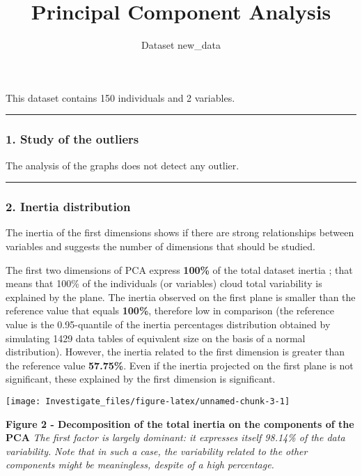 \documentclass[]{article}
\title{Principal Component Analysis}
\author{Dataset new\_data}
\date{}
\begin{document}
\maketitle

This dataset contains 150 individuals and 2 variables.

\begin{center}\rule{0.5\linewidth}{\linethickness}\end{center}

\subsubsection{1. Study of the outliers}\label{study-of-the-outliers}

The analysis of the graphs does not detect any outlier.

\begin{center}\rule{0.5\linewidth}{\linethickness}\end{center}

\subsubsection{2. Inertia distribution}\label{inertia-distribution}

The inertia of the first dimensions shows if there are strong
relationships between variables and suggests the number of dimensions
that should be studied.

The first two dimensions of PCA express \textbf{100\%} of the total
dataset inertia ; that means that 100\% of the individuals (or
variables) cloud total variability is explained by the plane. The
inertia observed on the first plane is smaller than the reference value
that equals \textbf{100\%}, therefore low in comparison (the reference
value is the 0.95-quantile of the inertia percentages distribution
obtained by simulating 1429 data tables of equivalent size on the basis
of a normal distribution). However, the inertia related to the first
dimension is greater than the reference value \textbf{57.75\%}. Even if
the inertia projected on the first plane is not significant, these
explained by the first dimension is significant.

\begin{center}\texttt{[image: Investigate\_files/figure-latex/unnamed-chunk-3-1]} \end{center}

\textbf{Figure 2 - Decomposition of the total inertia on the components
of the PCA} \emph{The first factor is largely dominant: it expresses
itself 98.14\% of the data variability.} \emph{Note that in such a case,
the variability related to the other components might be meaningless,
despite of a high percentage.}
\end{document}
